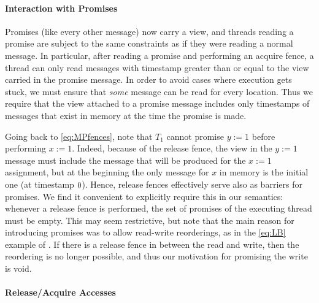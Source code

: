\paragraph{Interaction with Promises}

Promises (like every other message) now carry a view,
and threads reading a promise are subject to the same constraints as if they were reading a normal message.
In particular, after reading a promise and performing an acquire fence, a thread can only read messages
with timestamp greater than or equal to the view carried in the promise message.
In order to avoid cases where execution gets stuck, we must ensure that \emph{some} message can be read
for every location. Thus we require that the view attached to a promise message includes only timestamps of messages that exist in memory at the time the promise is made.

Going back to \ref{eq:MPfences}, note that $T_1$ cannot promise $y:=1$
before performing $x:=1$. Indeed, because of the release fence, the view in the $y:=1$ message must include the message
that will be produced for the $x:=1$ assignment, but at the beginning the only message for $x$ in memory is the initial one (at timestamp $\mbox{\small0}$).
Hence, release fences effectively serve also as barriers for promises.
We find it convenient to explicitly require this in our semantics: whenever a release fence is performed,
the set of promises of the executing thread must be empty.
This may seem restrictive, but note that the main reason for introducing promises was to allow read-write reorderings,
as in the \ref{eq:LB} example of .
If there is a release fence in between the read and write, then the reordering is no longer possible, and thus our motivation for promising the write is void.

\paragraph{Release/Acquire Accesses}

